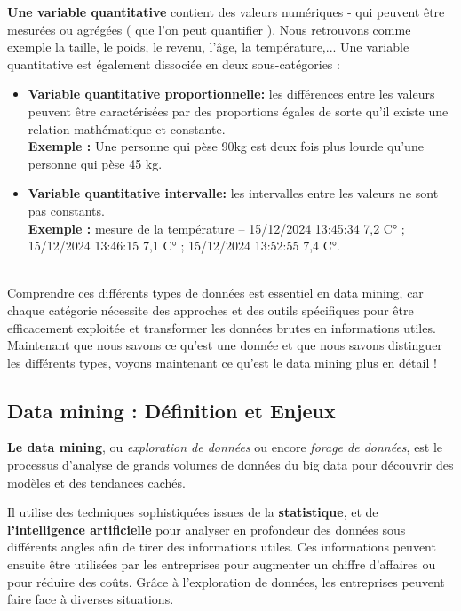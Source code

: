 \documentclass[a4paper,12pt]{article}
\begin{document}
           \textbf{Une variable quantitative} contient des valeurs numériques - qui peuvent être mesurées ou agrégées ( que l'on peut quantifier ). Nous retrouvons comme exemple la taille, le poids, le revenu, l'âge, la température,...
            Une variable quantitative est également dissociée en deux sous-catégories :
            
            \begin{itemize}
                \item \textbf{Variable quantitative proportionnelle:} les différences entre les valeurs peuvent être caractérisées par des proportions égales de sorte qu'il existe une relation mathématique et constante. \\
                \textbf{Exemple :} Une personne qui pèse 90kg est deux fois plus lourde qu’une personne qui pèse 45 kg.
                \item \textbf{Variable quantitative intervalle:} les intervalles entre les valeurs ne sont pas constants. \\
                \textbf{Exemple :} mesure de la température – 15/12/2024 13:45:34 7,2 C° ; 15/12/2024 13:46:15 7,1 C° ; 15/12/2024 13:52:55 7,4 C°.
            \end{itemize}\\
            
        Comprendre ces différents types de données est essentiel en data mining, car chaque catégorie nécessite des approches et des outils spécifiques pour être efficacement exploitée et transformer les données brutes en informations utiles. \\
        
        Maintenant que nous savons ce qu’est une donnée et que nous savons distinguer les différents types, voyons maintenant ce qu’est le data mining plus en détail !
    

    \subsection{Data mining : Définition et Enjeux}
        \textbf{Le data mining}, ou \textit{exploration de données} ou encore \textit{forage de données}, est le processus d'analyse de grands volumes de données du big data pour découvrir des modèles et des tendances cachés. 

        Il utilise des techniques sophistiquées issues de la \textbf{statistique}, et de \textbf{l'intelligence artificielle} pour analyser en profondeur des données sous différents angles afin de tirer des informations utiles. Ces informations peuvent ensuite être utilisées par les entreprises pour augmenter un chiffre d’affaires ou pour réduire des coûts.
        Grâce à l'exploration de données, les entreprises peuvent faire face à diverses situations.  
\end{document}

